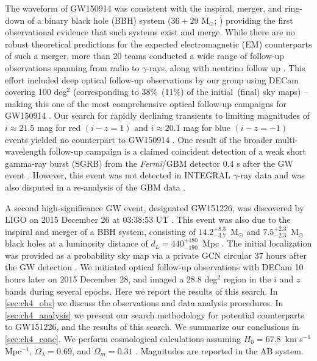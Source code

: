 The waveform of GW150914 was consistent with the inspiral, merger,
and ring-down of a binary black hole (BBH) system ($36+29$ M$_\odot$;
\citealt{LIGOGW150914}) providing the first observational
evidence that such systems exist and merge. While there are no robust
theoretical predictions for the expected electromagnetic (EM)
counterparts of such a merger, more than 20 teams conducted a wide
range of follow-up observations spanning from radio to $\gamma$-rays, along with neutrino follow up
\citep{LIGOGW150914FollowUp,LIGOGW150914FollowUpSupp,GW150914IceCube,Annis+16,GW150914Fermi,Evans+16,Kasliwal+16,Savchenko+16,GW150914PS1,GW150914DECam,Tavani+16}.
This effort included deep optical follow-up observations by our group using DECam covering 100 deg$^2$
(corresponding to 38\%~(11\%) of the initial~(final) sky maps)
 -- making this one of the most comprehensive optical
follow-up campaigns for GW150914 \citep{Annis+16,GW150914DECam}. Our search for rapidly
declining transients to limiting magnitudes of $i\approx21.5$ mag
for red $(i-z=1)$ and $i\approx20.1$ mag for blue $(i-z=-1)$ events yielded no counterpart to
GW150914 \citep{GW150914DECam}. One result of the broader multi-wavelength
follow-up campaign is a claimed coincident detection of a weak short
gamma-ray burst (SGRB) from the {\it Fermi}/GBM detector 0.4 s after
the GW event \citep{GW150914Fermi}. However, this event was not
detected in INTEGRAL $\gamma$-ray data \citep{Savchenko+16} and was also
disputed in a re-analysis of the GBM data \citep{Greiner+16}.

A second high-significance GW event, designated GW151226, was
discovered by LIGO on 2015 December 26 at 03:38:53 UT \citep{LIGOGW151226}.
This event was also due to the inspiral and merger of a BBH system, consisting
of $14.2^{+8.3}_{-3.7}$~M$_\odot$ and $7.5^{+2.3}_{-2.3}$~M$_\odot$ black holes at a luminosity
distance of $d_L = 440^{+180}_{-190}$~Mpc \citep{LIGOGW151226}.
The initial localization was provided as a probability sky map via a private
GCN circular 37 hours after the GW detection \citep{SingerPrice16}. We initiated
optical follow-up observations with DECam 10 hours later on 2015 December 28,
and imaged a 28.8 deg$^2$ region in the $i$ and $z$ bands during several epochs. Here we report
the results of this search. In \cref{sec:ch4_obs} we discuss the
observations and data analysis procedures. In \cref{sec:ch4_analysis}
we present our search methodology for potential counterparts to GW151226,
and the results of this search. We summarize our conclusions in \cref{sec:ch4_conc}. We perform
cosmological calculations assuming $H_0 = 67.8$~km  s$^{-1}$ Mpc$^{-1}$,
$\Omega_{\lambda} = 0.69$, and $\Omega_m = 0.31$ \citep{Planck2016}.
 Magnitudes are reported in the AB system.

